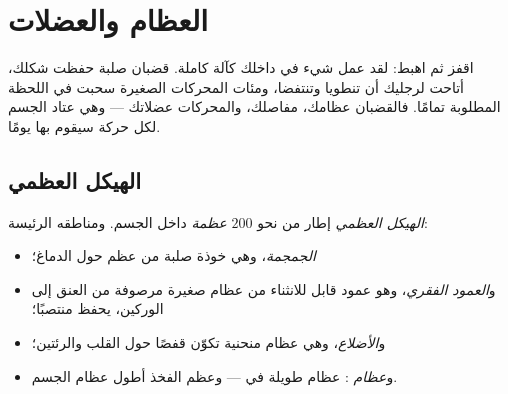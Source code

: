 \chapter{العظام والعضلات}\label{ch:g3:bones-and-muscles}

اقفز ثم اهبط: لقد عمل شيء في داخلك كآلة كاملة. قضبان صلبة حفظت
شكلك،  أتاحت لرجليك أن تنطويا وتنتفضا، ومئات المحركات
الصغيرة سحبت في اللحظة المطلوبة تمامًا. فالقضبان عظامك، 
مفاصلك، والمحركات عضلاتك --- وهي عتاد الجسم لكل حركة سيقوم بها
يومًا.

\section{الهيكل العظمي}

\begin{definition}\label{def:g3:bones-and-muscles:skeleton}
\emph{الهيكل العظمي} إطار من نحو $200$
\emph{عظمة} داخل الجسم. ومناطقه الرئيسة:
\begin{itemize}
  \item \emph{الجمجمة}، وهي خوذة صلبة من عظم حول
        الدماغ؛
  \item و\emph{العمود الفقري}، وهو عمود قابل
        للانثناء من عظام صغيرة مرصوفة من العنق إلى الوركين، يحفظ
         منتصبًا؛
  \item و\emph{الأضلاع}، وهي عظام منحنية تكوّن قفصًا حول
        القلب والرئتين؛
  \item و\emph{عظام }: عظام طويلة في   ---
        وعظم الفخذ أطول عظام الجسم.
\end{itemize}
\end{definition}


